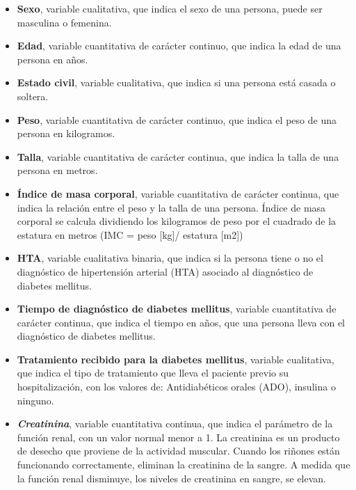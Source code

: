 \documentclass[runningheads,a4paper]{llncs}
\begin{document}
\begin{itemize}

\item \textbf{Sexo}, variable cualitativa, que indica el sexo de una persona, puede ser masculina o femenina.

\item \textbf{Edad}, variable cuantitativa de carácter continuo, que indica la edad de una persona en años.

\item \textbf{Estado civil}, variable cualitativa, que indica si una persona está casada o soltera.

\item \textbf{Peso}, variable cuantitativa de carácter continuo, que indica el peso de una persona en kilogramos.


\item \textbf{Talla}, variable cuantitativa de carácter continua, que indica la talla de una persona en metros.

\item \textbf{Índice de masa corporal}, variable cuantitativa de carácter continua, que indica la relación entre el peso y la talla de una persona. Índice de masa corporal  se calcula dividiendo los kilogramos de peso por el cuadrado de la estatura en metros (IMC = peso [kg]/ estatura [m2]) 

\item \textbf{\ac{HTA}}, variable cualitativa binaria, que indica si la persona tiene o no el diagnóstico de hipertensión arterial (HTA) asociado al diagnóstico de  diabetes mellitus.

\item \textbf{Tiempo de diagnóstico de diabetes mellitus}, variable cuantitativa de carácter continua,  que indica el tiempo en años, que una persona lleva con el diagnóstico de diabetes mellitus.

\item \textbf{Tratamiento recibido para la diabetes mellitus}, variable cualitativa, que indica el tipo de tratamiento que lleva el paciente previo su hospitalización, con los valores de: Antidiabéticos orales (ADO), insulina o  ninguno.

\item \textbf{ \textit{Creatinina}}, variable cuantitativa continua, que indica el parámetro de la función renal, con un valor normal menor a 1. La creatinina es un producto de desecho que proviene de la actividad muscular. Cuando los riñones están funcionando correctamente, eliminan la creatinina de la sangre. A medida que la función renal disminuye, los niveles de creatinina en sangre, se elevan.


\end{itemize}
\end{document}
